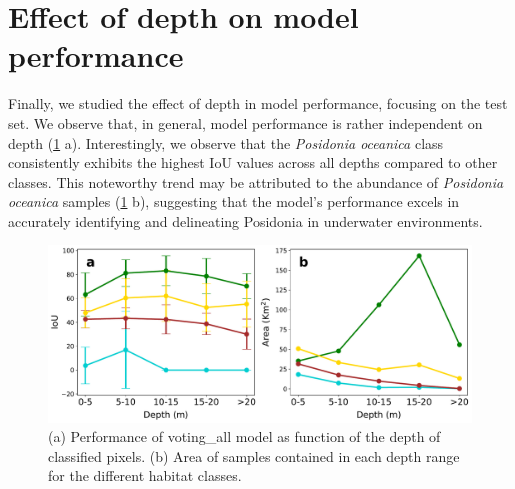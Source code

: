 \section{Effect of depth on model performance}\label{app:depth}

Finally, we studied the effect of depth in model performance, focusing on
the test set. We observe that, in general, model performance is rather
independent on depth (\cref{fig:IoU_class_depth} a). Interestingly, we observe
that the \textit{Posidonia oceanica} class consistently exhibits the highest
IoU values across all depths compared to other classes. This noteworthy trend
may be attributed to the abundance of \textit{Posidonia oceanica} samples
(\cref{fig:IoU_class_depth} b), suggesting that the model's performance excels
in accurately identifying and delineating Posidonia in underwater environments.

\begin{figure}[H]
    \centering
    \includegraphics[width=\textwidth]{Figures/IoU_class_depth.pdf}
    \caption{(a) Performance of voting\_all model as function of the depth
        of classified pixels. (b) Area of samples contained in each depth range
        for the
        different habitat classes.}
    \label{fig:IoU_class_depth}
\end{figure}

